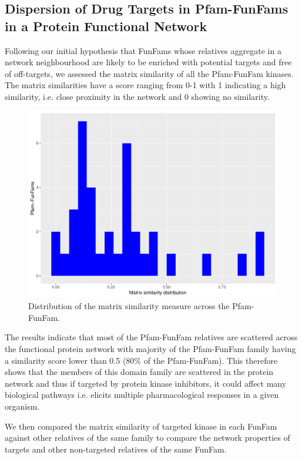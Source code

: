 \documentclass[a4paper, 11pt]{article}
\begin{document}
\subsection*{Dispersion of Drug Targets in Pfam-FunFams in a Protein Functional Network}
Following our initial hypothesis that FunFams whose relatives aggregate in a network neighbourhood are likely to be enriched with potential targets and free of off-targets, we assessed the matrix similarity of all the Pfam-FunFam kinases.  The matrix similarities have a score ranging from 0-1 with 1 indicating a high similarity, i.e. close proximity in the network and 0 showing no similarity. 
\begin{figure}[H]
	\includegraphics[width=.8\linewidth]{figures/pfam_simdist.pdf}
	\centering
	\caption{Distribution of the matrix similarity measure across the Pfam-FunFam.}
	\label{ksim_plot}
\end{figure}
The results indicate that most of the Pfam-FunFam relatives are scattered across the functional protein network with majority of the Pfam-FunFam family having a similarity score lower than 0.5 (80\% of the Pfam-FunFam). This therefore shows that the members of this domain family are scattered in the protein network and thus if targeted by protein kinase inhibitors, it could affect many biological pathways i.e. elicits multiple pharmacological responses in a given organism.\par
We then compared the matrix similarity of targeted kinase in each FunFam against other relatives of the same family to compare the network properties of targets and other non-targeted relatives of the same FunFam. 
\end{document}
